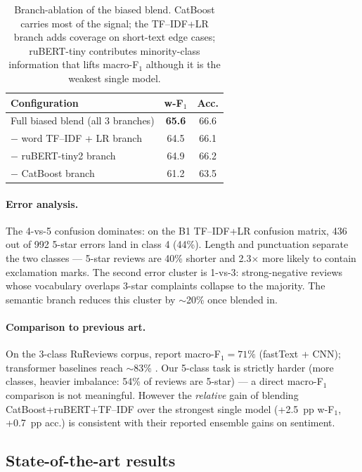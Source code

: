 \documentclass[11pt]{article}
\begin{document}
\begin{table}[t]
  \centering
  \small
  \begin{tabular}{lcc}
    \toprule
    Configuration & w-F$_1$ & Acc. \\
    \midrule
    Full biased blend (all 3 branches)         & \textbf{65.6} & 66.6 \\
    $-$ word TF--IDF + LR branch               & 64.5 & 66.1 \\
    $-$ ruBERT-tiny2 branch                    & 64.9 & 66.2 \\
    $-$ CatBoost branch                        & 61.2 & 63.5 \\
    \bottomrule
  \end{tabular}
  \caption{Branch-ablation of the biased blend. CatBoost carries most of the
  signal; the TF--IDF+LR branch adds coverage on short-text edge cases;
  ruBERT-tiny contributes minority-class information that lifts
  macro-F$_1$ although it is the weakest single model.}
  \label{tab:abl}
\end{table}

\paragraph{Error analysis.} The 4-vs-5 confusion dominates: on the B1
TF--IDF+LR confusion matrix, 436 out of 992 5-star errors land in class 4
(44\%). Length and punctuation separate the two classes --- 5-star reviews
are 40\% shorter and 2.3$\times$ more likely to contain exclamation marks.
The second error cluster is 1-vs-3: strong-negative reviews whose vocabulary
overlaps 3-star complaints collapse to the majority. The semantic branch
reduces this cluster by $\sim$20\% once blended in.

\paragraph{Comparison to previous art.} On the 3-class RuReviews corpus,
\citet{smetanin2019rureviews} report macro-F$_1 = 71\%$ (fastText + CNN);
transformer baselines reach $\sim$83\% \citep{zmitrovich2023family}. Our
5-class task is strictly harder (more classes, heavier imbalance: 54\% of
reviews are 5-star) --- a direct macro-F$_1$ comparison is not meaningful.
However the \emph{relative} gain of blending CatBoost+ruBERT+TF--IDF over the
strongest single model (+2.5~pp w-F$_1$, +0.7~pp acc.) is consistent with
their reported ensemble gains on sentiment.

\subsection{State-of-the-art results}
\label{sec:sota}
\end{document}
